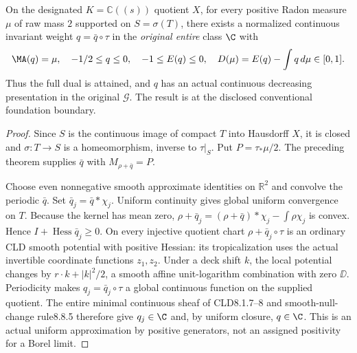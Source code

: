 \begin{theorem}\label{newrad:analytic}
On the designated $K=\mathbb C((s))$ quotient $X$, for every positive
Radon measure $\mu$ of raw mass $2$ supported on
$S=\sigma(T)$, there exists a normalized continuous invariant weight
$q=\bar q\circ\tau$ in the \emph{original entire} class $\C$ with
\[
 \MA(q)=\mu,\quad -1/2\le q\le0,\quad -1\le E(q)\le0,
 \quad D(\mu)=E(q)-\int q\,d\mu\in[0,1].
\]
Thus the full dual is attained, and $q$ has an actual continuous
decreasing presentation in the original $\mathcal G$.
The result is at the disclosed conventional foundation boundary.
\end{theorem}
\begin{proof}
Since $S$ is the continuous image of compact $T$ into Hausdorff $X$,
it is closed and $\sigma:T\to S$ is a homeomorphism, inverse to
$\tau|_S$. Put $P=\tau_*\mu/2$. The preceding theorem supplies
$\bar q$ with $M_{\rho+\bar q}=P$.

Choose even nonnegative smooth approximate identities on $\mathbb R^2$
and convolve the periodic $\bar q$. Set $\bar q_j=\bar q*\chi_j$.
Uniform continuity gives global uniform convergence on $T$.
Because the kernel has mean zero,
$\rho+\bar q_j=(\rho+\bar q)*\chi_j-\int\rho\chi_j$ is convex.
Hence $I+\operatorname{Hess}\bar q_j\ge0$.
On every injective quotient chart $\rho+\bar q_j\circ\tau$ is an
ordinary CLD smooth potential with positive Hessian: its tropicalization
uses the actual invertible coordinate functions $z_1,z_2$. Under a
deck shift $k$, the local potential changes by $r\cdot k+|k|^2/2$,
a smooth affine unit-logarithm combination with zero $\DD$.
Periodicity makes $q_j=\bar q_j\circ\tau$ a global continuous
function on the supplied quotient. The entire minimal continuous
sheaf of CLD8.1.7--8 and smooth-null-change rule8.8.5 therefore give
$q_j\in\C$ and, by uniform closure, $q\in\C$. This is an actual
uniform approximation by positive generators, not an assigned positivity
for a Borel limit.


\end{proof}
